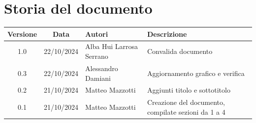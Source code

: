 \documentclass[10pt]{article}
\begin{document}
    \section{Storia del documento}
    \begin{center}
        \begin{tabular}{ c c p{3.90cm} p{5cm} }
            \rowcolor{gray!20}\rule{0pt}{0.5cm}\textbf{Versione} & \textbf{Data} & \textbf{Autori} & \textbf{Descrizione} \\[0.7ex]
            \hline
            \rule{0pt}{0.5cm}1.0 & 22/10/2024 & Alba Hui Larrosa Serrano & Convalida documento\\[0.7ex]
            \hline
            \rule{0pt}{0.5cm}0.3 & 22/10/2024 & Alessandro Damiani & Aggiornamento grafico e verifica\\[0.7ex]
            \hline
            \rule{0pt}{0.5cm}0.2 & 21/10/2024 & Matteo Mazzotti & Aggiunti titolo e sottotitolo\\[0.7ex]
            \hline
            \rule{0pt}{0.5cm}0.1 & 21/10/2024 & Matteo Mazzotti & Creazione del documento, compilate sezioni da 1 a 4\\[0.7ex]
        \end{tabular}
\end{center}
\end{document}

